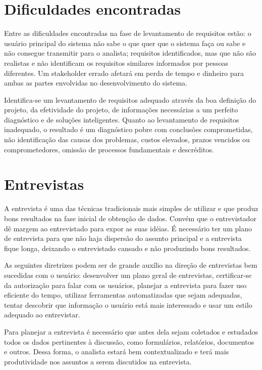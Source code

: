 \documentclass[12pt]{article}
\begin{document}
\pagebreak

\section{Dificuldades encontradas}
Entre as dificuldades encontradas na fase de levantamento de requisitos estão: o usuário principal do sistema não sabe o que quer que o sistema faça ou sabe e não consegue transmitir para o analista; requisitos identificados, mas que não são realistas e não identificam os requisitos similares informados por pessoas diferentes. Um stakeholder errado afetará em perda de tempo e dinheiro para ambas as partes envolvidas no desenvolvimento do sistema.

Identifica-se um levantamento de requisitos adequado através da boa definição do projeto, da efetividade do projeto, de informações necessárias a um perfeito diagnóstico e de soluções inteligentes. Quanto ao levantamento de requisitos inadequado, o resultado é um diagnóstico pobre com conclusões comprometidas, não identificação das causas dos problemas, custos elevados, prazos vencidos ou comprometedores, omissão de processos fundamentais e descréditos.

\section{Entrevistas}

A entrevista é uma das técnicas tradicionais mais simples de utilizar e que produz bons resultados na fase inicial de obtenção de dados. Convém que o entrevistador dê margem ao entrevistado para expor as suas idéias. É necessário ter um plano de entrevista para que não haja dispersão do assunto principal e a entrevista fique longa, deixando o entrevistado cansado e não produzindo bons resultados.

As seguintes diretrizes podem ser de grande auxílio na direção de entrevistas bem sucedidas com o usuário: desenvolver um plano geral de entrevistas, certificar-se da autorização para falar com os usuários, planejar a entrevista para fazer uso eficiente do tempo, utilizar ferramentas automatizadas que sejam adequadas, tentar descobrir que informação o usuário está mais interessado e usar um estilo adequado ao entrevistar.

Para planejar a entrevista é necessário que antes dela sejam coletados e estudados todos os dados pertinentes à discussão, como formulários, relatórios, documentos e outros. Dessa forma, o analista estará bem contextualizado e terá mais produtividade nos assuntos a serem discutidos na entrevista.
\end{document}
